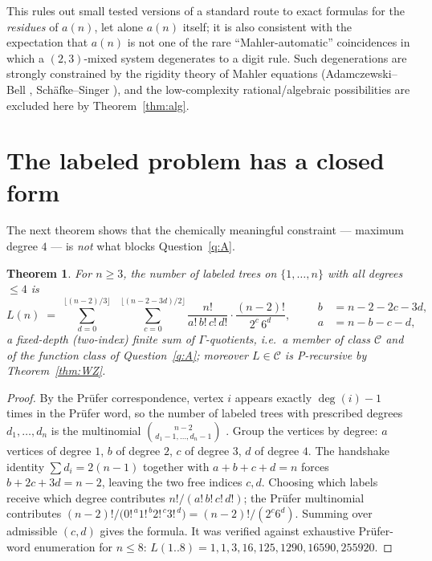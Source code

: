 \documentclass[11pt]{article}
\newtheorem{theorem}{Theorem}[section]
\theoremstyle{definition}
\begin{document}
This rules out small tested versions of a standard route to exact formulas for
the \emph{residues} of $a(n)$, let alone $a(n)$ itself; it is also consistent
with the expectation that $a(n)$ is not one of the rare ``Mahler-automatic''
coincidences in which a $(2,3)$-mixed system degenerates to a digit rule. Such
degenerations are strongly constrained by the rigidity theory of Mahler
equations (Adamczewski--Bell \cite{AdamczewskiBell2017}, Sch\"afke--Singer
\cite{SchafkeSinger2019}), and the low-complexity rational/algebraic
possibilities are excluded here by Theorem~\ref{thm:alg}.

\section{The labeled problem has a closed form}\label{sec:labeled}

The next theorem shows that the chemically meaningful constraint --- maximum
degree $4$ --- is \emph{not} what blocks Question~\ref{q:A}.

\begin{theorem}\label{thm:labeled}
For $n\ge3$, the number of labeled trees on $\{1,\dots,n\}$ with all degrees
$\le4$ is
\[
L(n)\;=\;\sum_{d=0}^{\lfloor (n-2)/3\rfloor}\;\;
\sum_{c=0}^{\lfloor (n-2-3d)/2\rfloor}
\frac{n!}{a!\,b!\,c!\,d!}\cdot\frac{(n-2)!}{2^{c}\,6^{d}},
\qquad
\begin{aligned}
b&=n-2-2c-3d,\\
a&=n-b-c-d,
\end{aligned}
\]
a fixed-depth (two-index) finite sum of $\Gamma$-quotients, i.e.\ a member of
class $\mathcal{C}$ and of the function class of Question~\ref{q:A}; moreover
$L\in\mathcal{C}$ is P-recursive by Theorem~\ref{thm:WZ}.
\end{theorem}

\begin{proof}
By the Pr\"ufer correspondence, vertex $i$ appears exactly $\deg(i)-1$ times in
the Pr\"ufer word, so the number of labeled trees with prescribed degrees
$d_1,\dots,d_n$ is the multinomial $\binom{n-2}{d_1-1,\dots,d_n-1}$
\cite{Moon1970}. Group the vertices by degree: $a$ vertices of degree $1$, $b$
of degree $2$, $c$ of degree $3$, $d$ of degree $4$. The handshake identity
$\sum d_i=2(n-1)$ together with $a+b+c+d=n$ forces $b+2c+3d=n-2$, leaving the
two free indices $c,d$. Choosing which labels receive which degree contributes
$n!/(a!\,b!\,c!\,d!)$; the Pr\"ufer multinomial contributes
$(n-2)!/\bigl(0!^{\,a}1!^{\,b}2!^{\,c}3!^{\,d}\bigr)=(n-2)!/(2^c6^d)$. Summing
over admissible $(c,d)$ gives the formula. It was verified against exhaustive
Pr\"ufer-word enumeration for $n\le8$:
$L(1..8)=1,1,3,16,125,1290,16590,255920$.
\end{proof}
\end{document}

